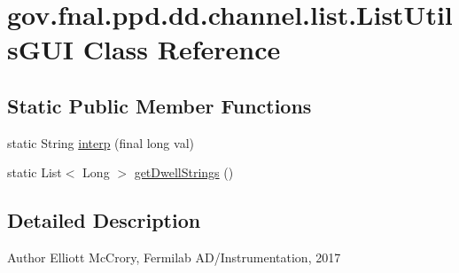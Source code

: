 \hypertarget{classgov_1_1fnal_1_1ppd_1_1dd_1_1channel_1_1list_1_1ListUtilsGUI}{\section{gov.\-fnal.\-ppd.\-dd.\-channel.\-list.\-List\-Utils\-G\-U\-I Class Reference}
\label{classgov_1_1fnal_1_1ppd_1_1dd_1_1channel_1_1list_1_1ListUtilsGUI}
}
\subsection*{Static Public Member Functions}
\begin{DoxyCompactItemize}
\item 
static String \hyperlink{classgov_1_1fnal_1_1ppd_1_1dd_1_1channel_1_1list_1_1ListUtilsGUI_a74040be8d5ff5ec79cf33db62e1ee673}{interp} (final long val)
\item 
static List$<$ Long $>$ \hyperlink{classgov_1_1fnal_1_1ppd_1_1dd_1_1channel_1_1list_1_1ListUtilsGUI_acf82b25a88214152cebb51e1d9ae2bb1}{get\-Dwell\-Strings} ()
\end{DoxyCompactItemize}


\subsection{Detailed Description}
\begin{DoxyAuthor}{Author}
Elliott Mc\-Crory, Fermilab A\-D/\-Instrumentation, 2017 
\end{DoxyAuthor}


